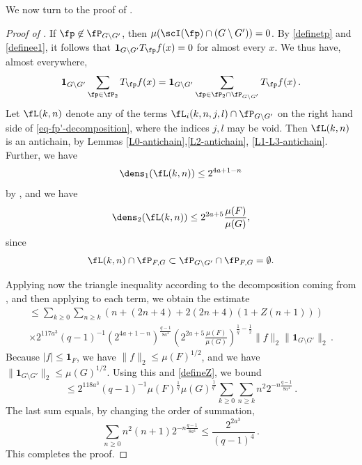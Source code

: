 We now turn to the proof of .
\begin{proof}[Proof of ]
    \leanok
    If $\fp \not\in \fP_{G \setminus G'}$, then $\mu(\scI(\fp) \cap (G \setminus G')) = 0$. By \eqref{definetp} and \eqref{definee1}, it follows that
    $\mathbf{1}_{G \setminus G'} T_{\fp}f(x) = 0$ for almost every $x$. We thus have, almost everywhere,
    $$
        \mathbf{1}_{G\setminus G'} \sum_{\fp \in \fP_2} T_{\fp}f(x) = \mathbf{1}_{G\setminus G'} \sum_{\fp \in \fP_2 \cap \fP_{G \setminus G'}} T_{\fp}f(x)\,.
    $$
    Let $\fL(k,n)$ denote any of the terms $\fL_i(k,n,j,l) \cap \fP_{G \setminus G'}$ on the right hand side of \eqref{eq-fp'-decomposition}, where the indices $j, l$ may be void. Then $\fL(k,n)$ is an antichain, by Lemmas \ref{L0-antichain},\ref{L2-antichain}, \ref{L1-L3-antichain}. Further, we have
    \begin{equation*}
    \dens_1(\fL(k,n)) \le 2^{4a+1 - n}
    \end{equation*}
    by , and we have
    \begin{equation*}
     \dens_2(\fL(k,n)) \le 2^{2a+5} \frac{\mu(F)}{\mu(G)},
     \end{equation*}
     since
     \begin{equation*}
     \fL(k,n) \cap \fP_{F,G} \subset \fP_{G \setminus G'} \cap \fP_{F, G} = \emptyset.
     \end{equation*}

    Applying now the triangle inequality according to the decomposition coming from , and then applying  to each term, we obtain the estimate
    \begin{multline*}
        \le \sum_{k \ge 0} \sum_{n \ge k} (n + (2n+4) + 2(2n+4) (1+Z(n+1))) \\
        \times 2^{117a^3}(q-1)^{-1} (2^{4a+1-n})^{\frac{q-1}{8a^4}} (2^{2a+5} \frac{\mu(F)}{\mu(G)})^{\frac{1}{q} - \frac{1}{2}} \|f\|_2\|\mathbf{1}_{G\setminus G'}\|_2\,.
    \end{multline*}
    Because $|f| \le \mathbf{1}_F$, we have $\|f\|_2 \le \mu(F)^{1/2}$, and we have $\|\mathbf{1}_{G\setminus G'}\|_2 \le \mu(G)^{1/2}$. Using this and \eqref{defineZ}, we bound
    $$
        \le 2^{118a^3} (q - 1)^{-1} \mu(F)^{\frac{1}{q}} \mu(G)^{\frac{1}{q'}} \sum_{k \ge 0} \sum_{n \ge k} n^2 2^{-n\frac{q-1}{8a^4}}\,.
    $$
    The last sum equals, by changing the order of summation,
    $$
        \sum_{n \ge 0} n^2(n+1) 2^{-n\frac{q-1}{8a^4}} \le \frac{2^{2a^3}}{(q-1)^4}\,.
    $$
    This completes the proof.
\end{proof}

